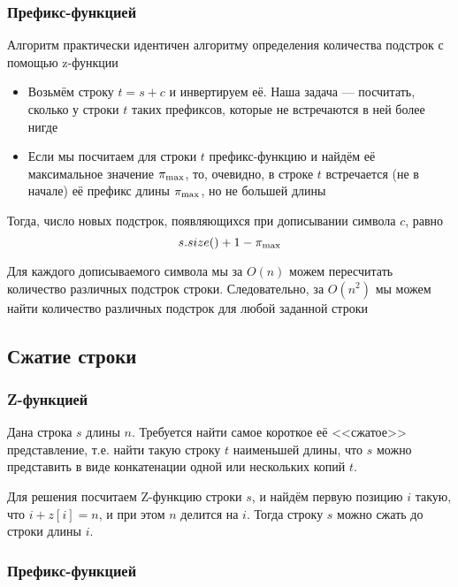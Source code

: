 \documentclass[a4paper]{article}
\begin{document}
\subsubsection{Префикс-функцией}
Алгоритм практически идентичен алгоритму определения количества подстрок с помощью z-функции
\begin{itemize}
    \item Возьмём строку $t = s + c$ и инвертируем её. Наша задача — посчитать, сколько у строки $t$ таких префиксов, которые не встречаются в ней более нигде
    \item Если мы посчитаем для строки $t$ префикс-функцию и найдём её максимальное значение $\pi_{\rm max}$, то, очевидно, в строке $t$ встречается (не в начале) её префикс длины $\pi_{\rm max}$, но не большей длины
\end{itemize}

Тогда, число новых подстрок, появляющихся при дописывании символа $c$, равно 
$$s.size() + 1 - \pi_{\rm max}$$

\difficulty Для каждого дописываемого символа мы за $O(n)$ можем пересчитать количество различных подстрок строки. Следовательно, за $O(n^2)$ мы можем найти количество различных подстрок для любой заданной строки



\subsection{Сжатие строки}
\subsubsection{Z-функцией}
Дана строка $s$ длины $n$. Требуется найти самое короткое её <<сжатое>> представление, т.е. найти такую строку $t$ наименьшей длины, что $s$ можно представить в виде конкатенации одной или нескольких копий $t$.

Для решения посчитаем Z-функцию строки $s$, и найдём первую позицию $i$ такую, что $i + z[i] = n$, и при этом $n$ делится на $i$. Тогда строку $s$ можно сжать до строки длины $i$.


\subsubsection{Префикс-функцией}
\end{document}
